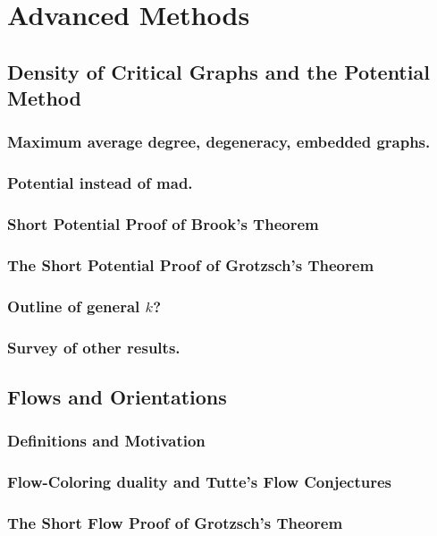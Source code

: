 \documentclass[12pt,twoside,openright,a4paper]{book}
\begin{document}
\part{Advanced Methods}

\chapter{Density of Critical Graphs and the Potential Method}


\section{Maximum average degree, degeneracy, embedded graphs.}
\section{Potential instead of mad.}
\section{Short Potential Proof of Brook's Theorem}
\section{The Short Potential Proof of Grotzsch's Theorem}
\section{Outline of general $k$?}
\section{Survey of other results.}

\chapter{Flows and Orientations}
\section{Definitions and Motivation}
\section{Flow-Coloring duality and Tutte's Flow Conjectures}
\section{The Short Flow Proof of Grotzsch's Theorem}
\end{document}
